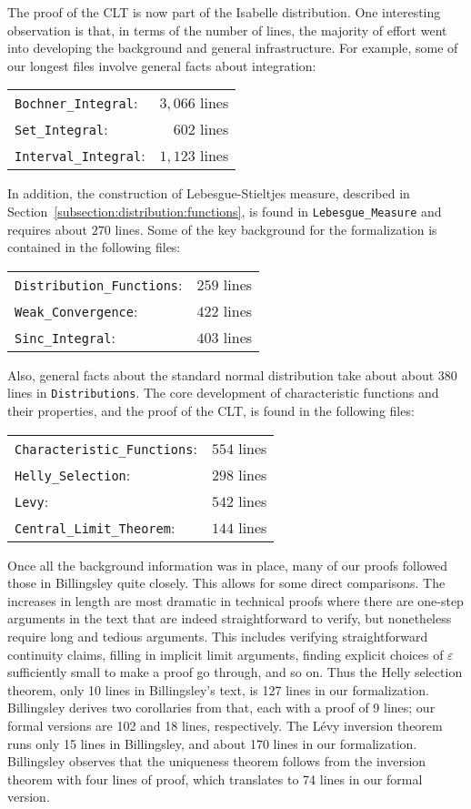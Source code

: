 \documentclass{svjour3}
\begin{document}
The proof of the CLT is now part of the Isabelle distribution. One interesting observation is that, in terms of the number of lines, the majority of effort went into developing the background and general infrastructure. For example, some of our longest files involve general facts about integration:
\begin{center}
\begin{tabular}{lr}
\verb=Bochner_Integral=: & $3,066$ lines \\
\verb=Set_Integral=: & $602$ lines \\
\verb=Interval_Integral=: & $1,123$ lines
\end{tabular}
\end{center}
In addition, the construction of Lebesgue-Stieltjes measure, described in Section~\ref{subsection:distribution:functions}, is found in \verb=Lebesgue_Measure= and requires about $270$ lines. Some of the key background for the formalization is contained in the following files:
\begin{center}
\begin{tabular}{lr}
 \verb=Distribution_Functions=: & $259$ lines \\
 \verb=Weak_Convergence=: & $422$ lines \\
 \verb=Sinc_Integral=: & $403$ lines
\end{tabular}
\end{center}
Also, general facts about the standard normal distribution take about about $380$ lines in \texttt{Distributions}. The core development of characteristic functions and their properties, and the proof of the CLT, is found in the following files:
\begin{center}
\begin{tabular}{lr}
 \verb=Characteristic_Functions=: & $554$ lines \\
 \verb=Helly_Selection=: & $298$ lines \\
 \verb=Levy=: & $542$ lines \\
 \verb=Central_Limit_Theorem=: & $144$ lines
\end{tabular}
\end{center}
Once all the background information was in place, many of our proofs followed those in Billingsley quite closely. This allows for some direct comparisons. The increases in length are most dramatic in technical proofs where there are one-step arguments in the text that are indeed straightforward to verify, but nonetheless require long and tedious arguments. This includes verifying straightforward continuity claims, filling in implicit limit arguments, finding explicit choices of $\varepsilon$ sufficiently small to make a proof go through, and so on. Thus the Helly selection theorem, only 10 lines in Billingsley's text, is 127 lines in our formalization. Billingsley derives two corollaries from that, each with a proof of 9 lines; our formal versions are 102 and 18 lines, respectively. The L\'evy inversion theorem runs only 15 lines in Billingsley, and about 170 lines in our formalization. Billingsley observes that the uniqueness theorem follows from the inversion theorem with four lines of proof, which translates to 74 lines in our formal version.
\end{document}
